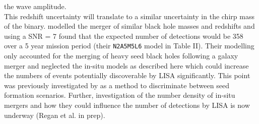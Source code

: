 \documentclass[graphics, twocolumn, usenatbib]{mn2e}
\begin{document}
the wave amplitude. \\
\indent This redshift uncertainty will translate to a similar uncertainty in the chirp mass of the binary.
\cite{Klein_2016} modelled the merger of similar black hole masses and redshifts and using a
SNR = 7 found that the expected number of detections would be 358 over a 5 year mission period
(their \texttt{N2A5M5L6} model in Table II). Their modelling only accounted for the merging of
heavy seed black holes following a galaxy merger and
neglected the in-situ models as described here which could increase the numbers of events potentially
discoverable by LISA significantly. This point was previously investigated by
\cite{Hartwig_2018} as a method to discriminate between seed formation scenarios. Further,
investigation of the number density of in-situ mergers and how they could influence the number
of detections by LISA is now underway (Regan et al. in prep).
\end{document}
